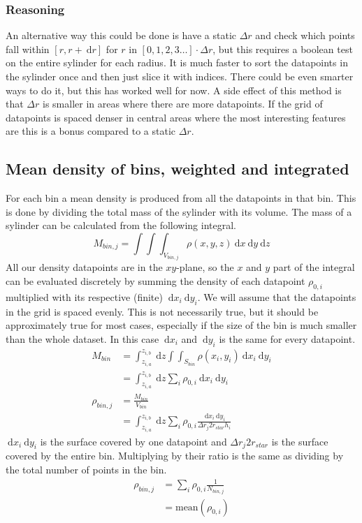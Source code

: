 \documentclass[a4paper, 12pt, english, titlepage]{article}
\newcommand{\D}[1]{\ \mathrm{d}#1} %
\begin{document}
    \subsubsection{Reasoning}
        An alternative way this could be done is have a static $\Delta r$ and check which points fall within $[r, r + \D r]$ for $r$ in $[0, 1, 2, 3 \hdots]\cdot\Delta r$, but this requires a boolean test on the entire sylinder for each radius. It is much faster to sort the datapoints in the sylinder once and then just slice it with indices. There could be even smarter ways to do it, but this has worked well for now. A side effect of this method is that $\Delta r$ is smaller in areas where there are more datapoints. If the grid of datapoints is spaced denser in central areas where the most interesting features are this is a bonus compared to a static $\Delta r$.


\subsection{Mean density of bins, weighted and integrated}
    For each bin a mean density is produced from all the datapoints in that bin. This is done by dividing the total mass of the sylinder with its volume. The mass of a sylinder can be calculated from the following integral.
    $$
    M_{bin,j} = \int\int\int_{V_{bin,j}} \rho(x,y,z) \D{x}\D{y}\D{z}
    $$
    All our density datapoints are in the $xy$-plane, so the $x$ and $y$ part of the integral can be evaluated discretely by summing the density of each datapoint $\rho_{0,i}$ multiplied with its respective (finite) $\D{x_i}\D{y_i}$. We will assume that the datapoints in the grid is spaced evenly. This is not necessarily true, but it should be approximately true for most cases, especially if the size of the bin is much smaller than the whole dataset. In this case $\D{x_i}$ and $\D{y_i}$ is the same for every datapoint.
    \begin{align*}
        M_{bin}
            &= \int_{z_{i,a}}^{z_{i,b}} \D{z}
                \int\int_{S_{bin}} \rho(x_i,y_i) \D{x_i}\D{y_i} \\
            &= \int_{z_{i,a}}^{z_{i,b}} \D{z}
                \sum_i \rho_{0,i} \D{x_i}\D{y_i} \\
        \rho_{bin,j} &= \frac{M_{bin}}{V_{bin}} \\
            &= \int_{z_{i,a}}^{z_{i,b}} \D{z}
                \sum_i \rho_{0,i}
                \frac{\D{x_i}\D{y_i}}{\Delta r_j 2 r_{star} h_i}
    \end{align*}
    $\D{x_i}\D{y_i}$ is the surface covered by one datapoint and $\Delta r_j 2 r_{star}$ is the surface covered by the entire bin. Multiplying by their ratio is the same as dividing by the total number of points in the bin.
    \begin{align*}
        \rho_{bin,j}
            &= \sum_i \rho_{0,i} \frac{1}{N_{bin,j}} \\
            &= \textrm{mean}(\rho_{0,i})
    \end{align*}
\end{document}
